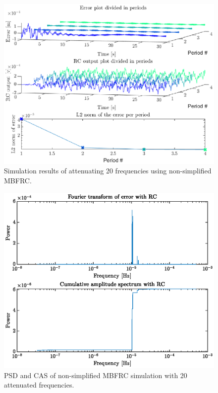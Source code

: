 \documentclass[journal]{IEEEtran}
\begin{document}
\begin{figure}
    \centering
    \includegraphics[width=1\linewidth]{figures/nonSimple_RC_MBFRC/SimulationNonSimp20.eps}
    \caption{Simulation results of attenuating 20 frequencies using non-simplified MBFRC.}
    \label{fig:SimNonSimp20}
\end{figure}
\begin{figure}
    \centering
    \includegraphics[width=1\linewidth]{figures/nonSimple_RC_MBFRC/FourierNonSimp20.eps}
    \caption{PSD and CAS of non-simplified MBFRC simulation with 20 attenuated frequencies.}
    \label{fig:fftNonSimp20}
\end{figure}
\end{document}
